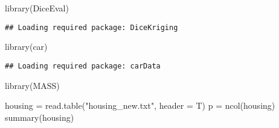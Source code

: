 \documentclass[
]{article}
\newenvironment{Shaded}{\begin{snugshade}}{\end{snugshade}}
\newcommand{\AttributeTok}[1]{\textcolor[rgb]{0.77,0.63,0.00}{#1}}
\newcommand{\FunctionTok}[1]{\textcolor[rgb]{0.00,0.00,0.00}{#1}}
\newcommand{\NormalTok}[1]{#1}
\newcommand{\OtherTok}[1]{\textcolor[rgb]{0.56,0.35,0.01}{#1}}
\newcommand{\StringTok}[1]{\textcolor[rgb]{0.31,0.60,0.02}{#1}}
\begin{document}
\begin{Shaded}
\begin{Highlighting}[]
\FunctionTok{library}\NormalTok{(DiceEval)}
\end{Highlighting}
\end{Shaded}

\begin{verbatim}
## Loading required package: DiceKriging
\end{verbatim}

\begin{Shaded}
\begin{Highlighting}[]
\FunctionTok{library}\NormalTok{(car)}
\end{Highlighting}
\end{Shaded}

\begin{verbatim}
## Loading required package: carData
\end{verbatim}

\begin{Shaded}
\begin{Highlighting}[]
\FunctionTok{library}\NormalTok{(MASS)}

\NormalTok{housing }\OtherTok{=} \FunctionTok{read.table}\NormalTok{(}\StringTok{"housing\_new.txt"}\NormalTok{, }\AttributeTok{header =}\NormalTok{ T)}
\NormalTok{p }\OtherTok{=} \FunctionTok{ncol}\NormalTok{(housing)}
\FunctionTok{summary}\NormalTok{(housing)}
\end{Highlighting}
\end{Shaded}
\end{document}
